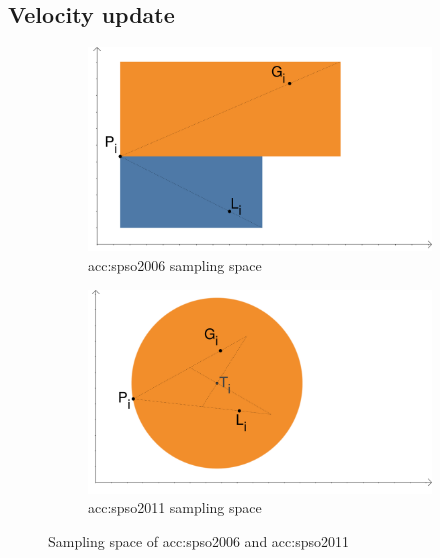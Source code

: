 \subsection{Velocity update}

\begin{figure}[b]
    \begin{subfigure}[t]{0.45\textwidth}
        \includegraphics[width=\textwidth]{img/pso2006.pdf}
        \caption{\acrshort*{acc:spso2006} sampling space}
        \label{fig:samplingspso2006}
    \end{subfigure}
    \hfill
    \begin{subfigure}[t]{0.45\textwidth}
        \includegraphics[width=\textwidth]{img/pso2011.pdf}
        \caption{\acrshort*{acc:spso2011} sampling space}
        \label{fig:samplingspso2011}
    \end{subfigure}
    \caption{Sampling space of \acrshort*{acc:spso2006} and \acrshort*{acc:spso2011}}
\end{figure}

